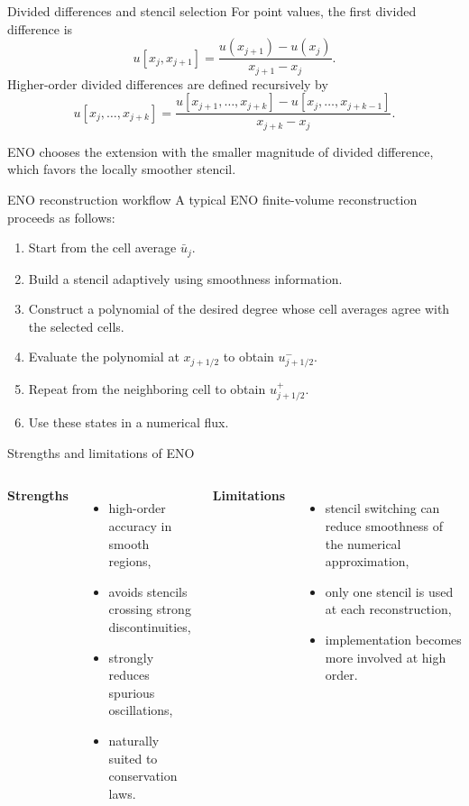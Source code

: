 \documentclass[aspectratio=169]{beamer}
\newcommand{\uh}{\bar{u}}
\begin{document}
\begin{frame}{Divided differences and stencil selection}
For point values, the first divided difference is
\begin{equation}
    u[x_j,x_{j+1}]
    =\frac{u(x_{j+1})-u(x_j)}{x_{j+1}-x_j}.
\end{equation}
Higher-order divided differences are defined recursively by
\begin{equation}
    u[x_j,\ldots,x_{j+k}]
    =
    \frac{
    u[x_{j+1},\ldots,x_{j+k}]
    -u[x_j,\ldots,x_{j+k-1}]
    }{x_{j+k}-x_j}.
\end{equation}

ENO chooses the extension with the smaller magnitude of divided difference, which favors the locally smoother stencil.
\end{frame}

\begin{frame}{ENO reconstruction workflow}
A typical ENO finite-volume reconstruction proceeds as follows:
\begin{enumerate}
    \item Start from the cell average $\uh_j$.
    \item Build a stencil adaptively using smoothness information.
    \item Construct a polynomial of the desired degree whose cell averages agree with the selected cells.
    \item Evaluate the polynomial at $x_{j+1/2}$ to obtain $u^-_{j+1/2}$.
    \item Repeat from the neighboring cell to obtain $u^+_{j+1/2}$.
    \item Use these states in a numerical flux.
\end{enumerate}
\end{frame}

\begin{frame}{Strengths and limitations of ENO}
\begin{columns}[T]
\textbf{Strengths}
\begin{itemize}
    \item high-order accuracy in smooth regions,
    \item avoids stencils crossing strong discontinuities,
    \item strongly reduces spurious oscillations,
    \item naturally suited to conservation laws.
\end{itemize}

\textbf{Limitations}
\begin{itemize}
    \item stencil switching can reduce smoothness of the numerical approximation,
    \item only one stencil is used at each reconstruction,
    \item implementation becomes more involved at high order.
\end{itemize}
\end{columns}
\end{frame}
\end{document}
